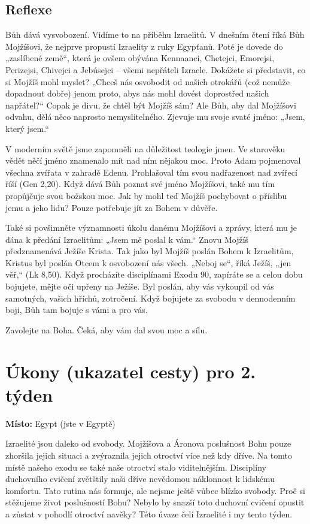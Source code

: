 \documentclass[11pt]{article}
\begin{document}
\subsection*{Reflexe}

Bůh dává vysvobození. Vidíme to na příběhu Izraelitů. V dnešním čtení říká Bůh Mojžíšovi, že nejprve propustí
Izraelity z ruky Egypťanů. Poté je dovede do „zaslíbené země“, která je ovšem obývána Kennaanci, Chetejci,
Emorejsi, Perizejsi, Chivejci a Jebúsejci – všemi nepřáteli Izraele. Dokážete si představit, co si Mojžíš mohl myslet?
„Chceš nás osvobodit od našich otrokářů (což nemůže dopadnout dobře) jenom proto, abys nás mohl dovést
doprostřed našich napřátel?“ Copak je divu, že chtěl být Mojžíš sám? Ale Bůh, aby dal Mojžíšovi odvahu, dělá něco
naprosto nemyslitelného. Zjevuje mu svoje svaté jméno: „Jsem, který jsem.“

V moderním světě jsme zapomněli na důležitost teologie jmen. Ve starověku vědět něčí jméno znamenalo mít nad
ním nějakou moc. Proto Adam pojmenoval všechna zvířata v zahradě Edenu. Prohlašoval tím svou nadřazenost nad
zvířecí říší (Gen 2,20). Když dává Bůh poznat své jméno Mojžíšovi, také mu tím propůjčuje svou božskou moc. Jak
by mohl teď Mojžíš pochybovat o příslibu jemu a jeho lidu? Pouze potřebuje jít za Bohem v důvěře.

Také si povšimněte významnosti úkolu danému Mojžíšovi a zprávy, která mu je dána k předání Izraelitům: „Jsem
mě poslal k vám.“ Znovu Mojžíš předznamenává Ježíše Krista. Tak jako byl Mojžíš poslán Bohem k Izraelitům,
Kristus byl poslán Otcem k osvobození nás všech. „Neboj se“, říká Ježíš, „jen věř,“ (Lk 8,50). Když procházíte
disciplínami Exodu 90, zapíráte se a celou dobu bojujete, mějte oči upřeny na Ježíše. Byl poslán, aby vás vykoupil
od vás samotných, vašich hříchů, zotročení. Když bojujete za svobodu v dennodenním boji, Bůh tam bojuje s vámi
a pro vás.

Zavolejte na Boha. Čeká, aby vám dal svou moc a sílu.


\newpage
\section*{Úkony (ukazatel cesty) pro 2. týden}

\textbf{Místo:} Egypt (jste v Egyptě)

Izraelité jsou daleko od svobody. Mojžíšova a Áronova poslušnost Bohu pouze zhoršila jejich situaci a zvýraznila jejich otroctví více než kdy dříve. Na tomto místě našeho exodu se také naše otroctví stalo viditelnějším. Disciplíny duchovního cvičení zvětštily naši dříve nevědomou náklonnost k lidskému komfortu. Tato rutina nás formuje, ale nejsme ještě vůbec blízko svobody. Proč si stěžujeme život poslušností Bohu? Nebylo by snazší toto duchovní cvičení opustit a zůstat v pohodlí otroctví navěky? Této úvaze čelí Izraelité i my tento týden.
\end{document}
